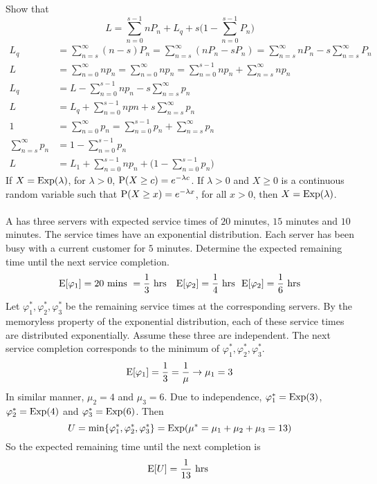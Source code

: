\documentclass[12pt]{article}
\begin{document}
 Show that $$L = \sum_{n=0}^{s-1} nP_n + L_q + s\Big( 1 - \sum_{n=0}^{s-1} P_n\Big) $$ 
 $$ \begin{aligned} 
 L_q &= \sum_{n=s}^\infty (n-s)P_n = \sum_{n=s}^\infty (nP_n - sP_n) = \sum_{n=s}^\infty nP_n - s\sum_{n=s}^\infty P_n \\ 
 L &= \sum_{n=0}^\infty np_n = \sum_{n=0}^\infty np_n = \sum_{n=0}^{s-1} np_n + \sum_{n=s}^\infty np_n \\ L_q &= L - \sum_{n=0}^{s-1} np_n - s\sum_{n=s}^\infty p_n \\ 
 L &= L_q + \sum_{n=0}^{s-1}npn + s\sum_{n=s}^\infty p_n \\ 
 1 &= \sum_{n=0}^\infty p_n = \sum_{n=0}^{s-1} p_n + \sum_{n=s}^\infty p_n \\ 
 \sum_{n=s}^\infty p_n &= 1 - \sum_{n=0}^{s-1} p_n \\ 
 L &= L_1 + \sum_{n=0}^{s-1} np_n + \Big(1 - \sum_{n=0}^{s-1} p_n\Big) \end{aligned} $$ 
 If $X = \text{Exp}( \lambda )$, for $\lambda > 0$, $\mathrm{P}( X \geq c ) = e^{-\lambda c}$. If $\lambda > 0$ and $X \geq 0$ is a continuous random variable such that $\mathrm{P}( X \geq x ) = e^{-\lambda x}$, for all $x > 0$, then $X = \text{Exp}( \lambda )$. \\~\\
 A \qs has three servers with expected service times of $20$ minutes, $15$ minutes and $10$ minutes. The service times have an exponential distribution. Each server has been busy with a current customer for $5$ minutes. Determine the expected remaining time until the next service completion. \\ 
 $$ \mathrm{E}[ \varphi_1 ] = 20 \text{ mins } = \frac{1}{3} \text{ hrs } ~~ \mathrm{E}[ \varphi_2 ] = \frac{1}{4} \text{ hrs} ~~ \mathrm{E}[ \varphi_2 ] = \frac{1}{6} \text{ hrs} $$ 
 Let $\varphi_1^*, \varphi_2^*, \varphi_3^*$ be the remaining service times at the corresponding servers. By the memoryless property of the exponential distribution, each of these service times are distributed exponentially. Assume these three are independent. The next service completion corresponds to the minimum of $\varphi_1^*,\varphi_2^*,\varphi_3^*$. 
 $$ \mathrm{E}[ \varphi_1 ] = \frac{1}{3} = \frac{1}{\mu} \to \mu_1 = 3$$ 
 In similar manner, $\mu_2 = 4$ and $\mu_3 = 6$. Due to independence, $\varphi_1^* = \text{Exp}( 3 )$, $\varphi_2^* = \text{Exp}( 4 )$ and $\varphi_3^* = \text{Exp}( 6 )$. Then 
 $$U = \min\{\varphi_1^*,\varphi_2^*,\varphi_3^*\} = \text{Exp}( \mu^* = \mu_1 + \mu_2 + \mu_3 = 13 ) $$ So the expected remaining time until the next completion is $$\mathrm{E}[ U ] = \frac{1}{13} \text{ hrs } $$ 
\end{document}
